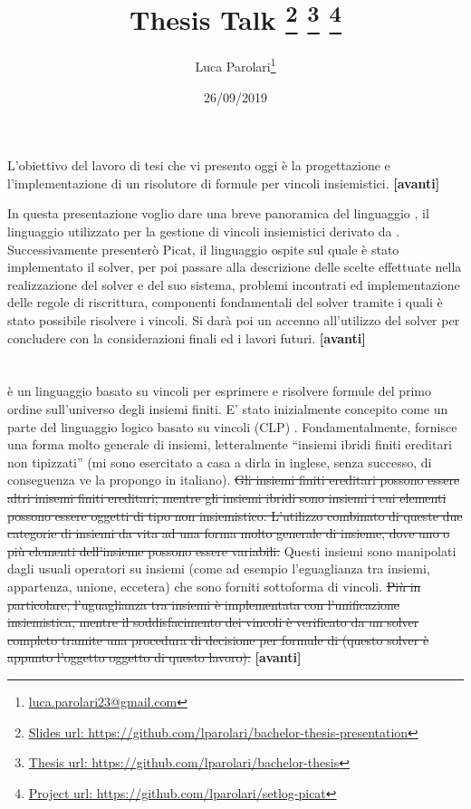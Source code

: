 \documentclass[11pt]{article}
\title{
	\textbf{Thesis Talk}
	\footnote{\href{https://github.com/lparolari/bachelor-thesis-presentation}{Slides url: https://github.com/lparolari/bachelor-thesis-presentation}}
	\footnote{\href{https://github.com/lparolari/bachelor-thesis}{Thesis url: https://github.com/lparolari/bachelor-thesis}}
	\footnote{\href{https://github.com/lparolari/setlog-picat}{Project url: https://github.com/lparolari/setlog-picat}}
}
\author{Luca Parolari\footnote{\href{mailto:luca.parolari23@gmail.com}{luca.parolari23@gmail.com}}}
\date{26/09/2019}
\newcommand*{\nextslide}{\textbf{[avanti]}}
\begin{document}
\maketitle

L'obiettivo del lavoro di tesi che vi presento oggi è la progettazione
e l'implementazione di un risolutore di formule per vincoli
insiemistici. \nextslide{}

In questa presentazione voglio dare una breve panoramica del
linguaggio \lset{}, il linguaggio utilizzato per la gestione di
vincoli insiemistici derivato da \clpset{}. Successivamente presenterò
Picat, il linguaggio ospite sul quale è stato implementato il solver,
per poi passare alla descrizione delle scelte effettuate nella
realizzazione del solver e del suo sistema, problemi incontrati ed
implementazione delle regole di riscrittura, componenti fondamentali
del solver tramite i quali è stato possibile risolvere i vincoli. Si
darà poi un accenno all'utilizzo del solver per concludere con la
considerazioni finali ed i lavori futuri. \nextslide{}

\section*{\lset{}}

\lset{} è un linguaggio basato su vincoli per esprimere e risolvere
formule del primo ordine sull'universo degli insiemi finiti. E' stato
inizialmente concepito come un parte del linguaggio logico basato su
vincoli (CLP) \clpset{}. Fondamentalmente, \lset{} fornisce una forma
molto generale di insiemi, letteralmente ``insiemi ibridi finiti
ereditari non tipizzati'' (mi sono esercitato a casa a dirla in
inglese, senza successo, di conseguenza ve la propongo in
italiano). \sout{Gli insiemi finiti ereditari possono essere altri
  inisemi finiti ereditari; mentre gli insiemi ibridi sono insiemi i
  cui elementi possono essere oggetti di tipo non
  insiemistico. L'utilizzo combinato di queste due categorie di
  insiemi da vita ad una forma molto generale di insieme, dove uno o
  più elementi dell'insieme possono essere variabili.} Questi insiemi
sono manipolati dagli usuali operatori su insiemi (come ad esempio
l'eguaglianza tra insiemi, appartenza, unione, eccetera) che sono
forniti sottoforma di vincoli. \sout{Più in particolare, l'uguaglianza
  tra insiemi è implementata con l'unificazione insiemistica, mentre
  il soddisfacimento dei vincoli è verificato da un solver completo
  tramite una procedura di decisione per formule di \lset{} (questo
  solver è appunto l'oggetto oggetto di questo lavoro).} \nextslide{}
\end{document}
